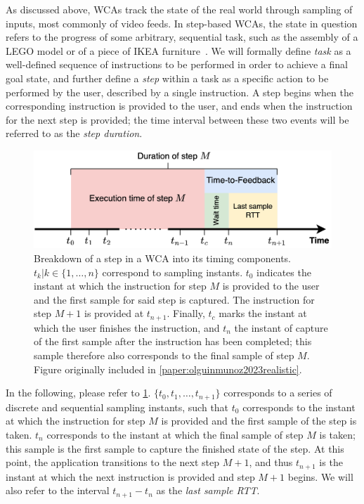 As discussed above, \glspl{WCA} track the state of the real world through sampling of inputs, most commonly of video feeds.
In step-based \glspl{WCA}, the state in question refers to the progress of some arbitrary, sequential task, such as the assembly of a LEGO model or of a piece of IKEA furniture~\cite{chen2018application}.
We will formally define \emph{task} as a well-defined sequence of instructions to be performed in order to achieve a final goal state, and further define a \emph{step} within a task as a specific action to be performed by the user, described by a single instruction.
A step begins when the corresponding instruction is provided to the user, and ends when the instruction for the next step is provided;
the time interval between these two events will be referred to as the \emph{step duration}.

\begin{figure}
    \centering
    \includegraphics[width=.9\textwidth]{publications/2023EdgeDroid2/figs/step_time}
    \caption[]{%
        Breakdown of a step in a \gls{WCA} into its timing components.
        \ensuremath{t_k | k \in \{1, \ldots, n \}} correspond to sampling instants.
        \ensuremath{t_0} indicates the instant at which the instruction for step \ensuremath{M} is provided to the user and the first sample for said step is captured.
        The instruction for step \ensuremath{M + 1} is provided at \ensuremath{t_{n+1}}.
        Finally, \ensuremath{t_c} marks the instant at which the user finishes the instruction, and \ensuremath{t_n} the instant of capture of the first sample after the instruction has been completed;
        this sample therefore also corresponds to the final sample of step \ensuremath{M}.
        Figure originally included in \cref{paper:olguinmunoz2023realistic}.
    }\label{fig:wcastep}
\end{figure}

In the following, please refer to \cref{fig:wcastep}.
\ensuremath{\{ t_0, t_1, \ldots, t_{n + 1} \}} corresponds to a series of discrete and sequential sampling instants, such that \ensuremath{t_0} corresponds to the instant at which the instruction for step \ensuremath{M} is provided and the first sample of the step is taken.
\ensuremath{t_n} corresponds to the instant at which the final sample of step \ensuremath{M} is taken;
this sample is the first sample to capture the finished state of the step.
At this point, the application transitions to the next step \ensuremath{M + 1}, and thus \ensuremath{t_{n + 1}} is the instant at which the next instruction is provided and step \ensuremath{M + 1} begins.
We will also refer to the interval \ensuremath{t_{n + 1} - t_n} as the \emph{last sample \gls{RTT}}.

